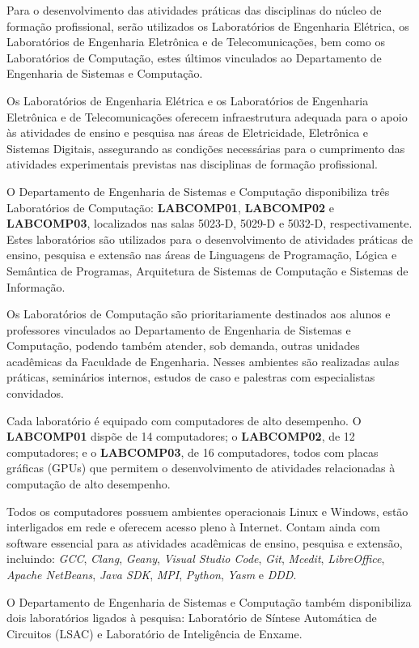 Para o desenvolvimento das atividades práticas das disciplinas do núcleo de formação profissional, serão utilizados os Laboratórios de Engenharia Elétrica, os Laboratórios de Engenharia Eletrônica e de Telecomunicações, bem como os Laboratórios de Computação, estes últimos vinculados ao Departamento de Engenharia de Sistemas e Computação.

Os Laboratórios de Engenharia Elétrica e os Laboratórios de Engenharia Eletrônica e de Telecomunicações oferecem infraestrutura adequada para o apoio às atividades de ensino e pesquisa nas áreas de Eletricidade, Eletrônica e Sistemas Digitais, assegurando as condições necessárias para o cumprimento das atividades experimentais previstas nas disciplinas de formação profissional.

O Departamento de Engenharia de Sistemas e Computação disponibiliza três Laboratórios de Computação: \textbf{LABCOMP01}, \textbf{LABCOMP02} e \textbf{LABCOMP03}, localizados nas salas 5023-D, 5029-D e 5032-D, respectivamente. Estes laboratórios são utilizados para o desenvolvimento de atividades práticas de ensino, pesquisa e extensão nas áreas de Linguagens de Programação, Lógica e Semântica de Programas, Arquitetura de Sistemas de Computação e Sistemas de Informação.

Os Laboratórios de Computação são prioritariamente destinados aos alunos e professores vinculados ao Departamento de Engenharia de Sistemas e Computação, podendo também atender, sob demanda, outras unidades acadêmicas da Faculdade de Engenharia. Nesses ambientes são realizadas aulas práticas, seminários internos, estudos de caso e palestras com especialistas convidados.

Cada laboratório é equipado com computadores de alto desempenho. O \textbf{LABCOMP01} dispõe de 14 computadores; o \textbf{LABCOMP02}, de 12 computadores; e o \textbf{LABCOMP03}, de 16 computadores, todos com placas gráficas (GPUs) que permitem o desenvolvimento de atividades relacionadas à computação de alto desempenho.

Todos os computadores possuem ambientes operacionais Linux e Windows, estão interligados em rede e oferecem acesso pleno à Internet. Contam ainda com software essencial para as atividades acadêmicas de ensino, pesquisa e extensão, incluindo: \textit{GCC}, \textit{Clang}, \textit{Geany}, \textit{Visual Studio Code}, \textit{Git}, \textit{Mcedit}, \textit{LibreOffice}, \textit{Apache NetBeans}, \textit{Java SDK}, \textit{MPI}, \textit{Python}, \textit{Yasm} e \textit{DDD}.

O Departamento de Engenharia de Sistemas e Computação também disponibiliza dois laboratórios ligados à pesquisa: Laboratório de Síntese Automática de Circuitos (LSAC) e Laboratório de Inteligência de Enxame.
